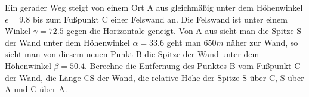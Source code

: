 
Ein gerader Weg steigt von einem Ort A aus gleichmäßig unter dem Höhenwinkel
$\epsilon = 9.8$ bis zum Fußpunkt C einer Felswand an. Die Felswand ist unter
einem Winkel $\gamma = 72.5$ gegen die Horizontale geneigt. Von A aus sieht
man die Spitze S der Wand unter dem Höhenwinkel $\alpha = 33.6$ geht man
$650 m$ näher zur Wand, so sieht man von diesem neuen Punkt B die Spitze
der Wand unter dem Höhenwinkel $\beta = 50.4$.  Berechne die Entfernung des
Punktes B vom Fußpunkt C der Wand, die Länge CS der Wand, die relative
Höhe der Spitze S über C, S über A und C über A.